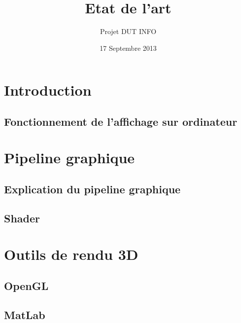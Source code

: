 \documentclass[12pt,a4paper,openany]{report}
\title{Etat de l'art}
\author{Projet DUT INFO}
\date{17 Septembre 2013}
\begin{document}
\maketitle

\hypertarget{tableofcontents}{} %
\tableofcontents

\part{Introduction}

\chapter{Fonctionnement de l'affichage sur ordinateur}


\part{Pipeline graphique}
\chapter{Explication du pipeline graphique}


\chapter{Shader}


\part{Outils de rendu 3D}

\chapter{OpenGL}


\chapter{MatLab}


\newpage
\end{document}
